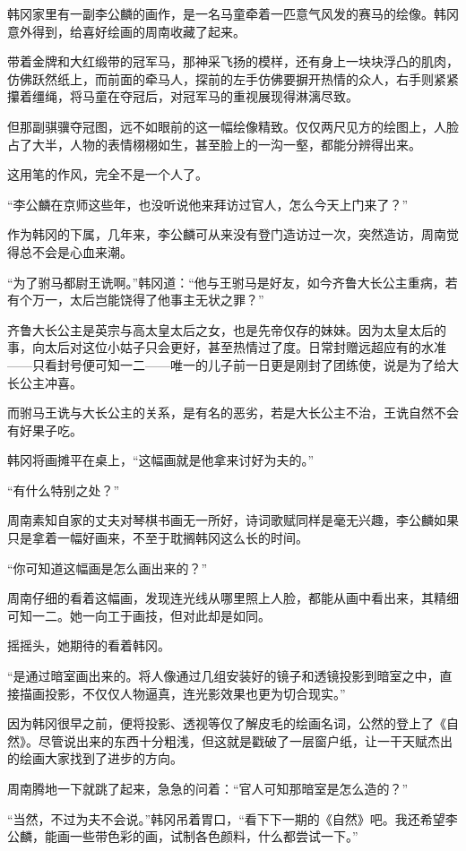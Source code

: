 韩冈家里有一副李公麟的画作，是一名马童牵着一匹意气风发的赛马的绘像。韩冈意外得到，给喜好绘画的周南收藏了起来。

带着金牌和大红缎带的冠军马，那神采飞扬的模样，还有身上一块块浮凸的肌肉，仿佛跃然纸上，而前面的牵马人，探前的左手仿佛要摒开热情的众人，右手则紧紧攥着缰绳，将马童在夺冠后，对冠军马的重视展现得淋漓尽致。

但那副骐骥夺冠图，远不如眼前的这一幅绘像精致。仅仅两尺见方的绘图上，人脸占了大半，人物的表情栩栩如生，甚至脸上的一沟一壑，都能分辨得出来。

这用笔的作风，完全不是一个人了。

“李公麟在京师这些年，也没听说他来拜访过官人，怎么今天上门来了？”

作为韩冈的下属，几年来，李公麟可从来没有登门造访过一次，突然造访，周南觉得总不会是心血来潮。

“为了驸马都尉王诜啊。”韩冈道：“他与王驸马是好友，如今齐鲁大长公主重病，若有个万一，太后岂能饶得了他事主无状之罪？”

齐鲁大长公主是英宗与高太皇太后之女，也是先帝仅存的妹妹。因为太皇太后的事，向太后对这位小姑子只会更好，甚至热情过了度。日常封赠远超应有的水准——只看封号便可知一二——唯一的儿子前一日更是刚封了团练使，说是为了给大长公主冲喜。

而驸马王诜与大长公主的关系，是有名的恶劣，若是大长公主不治，王诜自然不会有好果子吃。

韩冈将画摊平在桌上，“这幅画就是他拿来讨好为夫的。”

“有什么特别之处？”

周南素知自家的丈夫对琴棋书画无一所好，诗词歌赋同样是毫无兴趣，李公麟如果只是拿着一幅好画来，不至于耽搁韩冈这么长的时间。

“你可知道这幅画是怎么画出来的？”

周南仔细的看着这幅画，发现连光线从哪里照上人脸，都能从画中看出来，其精细可知一二。她一向工于画技，但对此却是如同。

摇摇头，她期待的看着韩冈。

“是通过暗室画出来的。将人像通过几组安装好的镜子和透镜投影到暗室之中，直接描画投影，不仅仅人物逼真，连光影效果也更为切合现实。”

因为韩冈很早之前，便将投影、透视等仅了解皮毛的绘画名词，公然的登上了《自然》。尽管说出来的东西十分粗浅，但这就是戳破了一层窗户纸，让一干天赋杰出的绘画大家找到了进步的方向。

周南腾地一下就跳了起来，急急的问着：“官人可知那暗室是怎么造的？”

“当然，不过为夫不会说。”韩冈吊着胃口，“看下下一期的《自然》吧。我还希望李公麟，能画一些带色彩的画，试制各色颜料，什么都尝试一下。”

